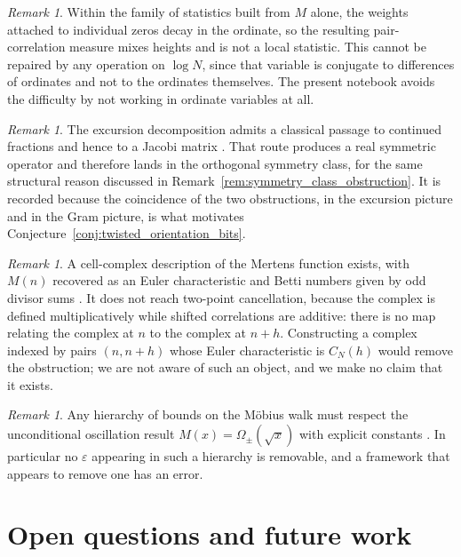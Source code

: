 \documentclass[11pt]{amsart}
\numberwithin{equation}{section}
\theoremstyle{plain}
\theoremstyle{definition}
\theoremstyle{remark}
\newtheorem{remark}[theorem]{Remark}
\begin{document}
\begin{remark}
\label{rem:negative_result_height_weighting}
Within the family of statistics built from $M$ alone, the weights
attached to individual zeros decay in the ordinate, so the resulting
pair-correlation measure mixes heights and is not a local statistic.
This cannot be repaired by any operation on $\log N$, since that
variable is conjugate to differences of ordinates and not to the
ordinates themselves. The present notebook avoids the difficulty by not
working in ordinate variables at all.
\end{remark}

\begin{remark}
\label{rem:negative_result_jacobi}
The excursion decomposition admits a classical passage to continued
fractions and hence to a Jacobi matrix \cite{Flajolet1980}. That route
produces a real symmetric operator and therefore lands in the
orthogonal symmetry class, for the same structural reason discussed in
Remark~\ref{rem:symmetry_class_obstruction}. It is recorded because the
coincidence of the two obstructions, in the excursion picture and in the
Gram picture, is what motivates
Conjecture~\ref{conj:twisted_orientation_bits}.
\end{remark}

\begin{remark}
\label{rem:negative_result_topology}
A cell-complex description of the Mertens function exists, with
$M(n)$ recovered as an Euler characteristic and Betti numbers given by
odd divisor sums \cite{Bjorner2011}. It does not reach two-point
cancellation, because the complex is defined multiplicatively while
shifted correlations are additive: there is no map relating the complex
at $n$ to the complex at $n+h$. Constructing a complex indexed by pairs
$(n, n+h)$ whose Euler characteristic is $C_N(h)$ would remove the
obstruction; we are not aware of such an object, and we make no claim
that it exists.
\end{remark}

\begin{remark}
\label{rem:negative_result_omega_lower_bound}
Any hierarchy of bounds on the M\"obius walk must respect the
unconditional oscillation result $M(x) = \Omega_\pm(\sqrt{x})$ with
explicit constants \cite{OdlyzkoteRiele1985}. In particular no
$\varepsilon$ appearing in such a hierarchy is removable, and a
framework that appears to remove one has an error.
\end{remark}

\section{Open questions and future work}
\label{sec:open_questions}
\end{document}
